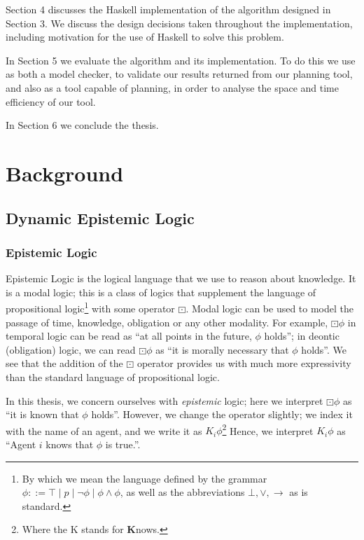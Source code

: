 \documentclass[10pt, a4paper]{report}
\begin{document}
Section 4 discusses the Haskell implementation of the algorithm designed in
Section 3. We discuss the design decisions taken throughout the implementation,
including motivation for the use of Haskell to solve this problem.

In Section 5 we evaluate the algorithm and its implementation. To do this we
use \cite{GithubGossip} as both a model checker, to validate our results
returned from our planning tool, and also as a tool capable of planning, in
order to analyse the space and time efficiency of our tool. 

In Section 6 we conclude the thesis. 

\newpage

\chapter{Background}

\section{Dynamic Epistemic Logic}
\label{sec:DEL}

\subsection{Epistemic Logic}

Epistemic Logic is the logical language that we use to reason about knowledge.
It is a modal logic; this is a class of logics that supplement the language of
propositional logic\footnote{By which we mean the language defined by the
  grammar $\phi ::= \top \mid p \mid \neg \phi \mid \phi \land \phi$, as well as
  the abbreviations $\bot, \lor, \rightarrow$ as is standard.} with some operator
$\boxdot$. Modal logic can be used to model the passage of time, knowledge,
obligation or any other modality. For example, $\boxdot \phi$ in temporal logic
can be read as ``at all points in the future, $\phi$ holds''; in deontic
(obligation) logic, we can read $\boxdot \phi$ as ``it is morally necessary that
$\phi$ holds''. We see that the addition of the $\boxdot$ operator provides us
with much more expressivity than the standard language of propositional logic.

In this thesis, we concern ourselves with \emph{epistemic} logic; here we
interpret $\boxdot \phi$ as ``it is known that $\phi$ holds''. However, we
change the operator slightly; we index it with the name of an agent, and we
write it as $K_i \phi$\footnote{Where the K stands for \textbf{K}nows.} Hence,
we interpret $K_i \phi$ as ``Agent $i$ knows that $\phi$ is true.''.
\end{document}
